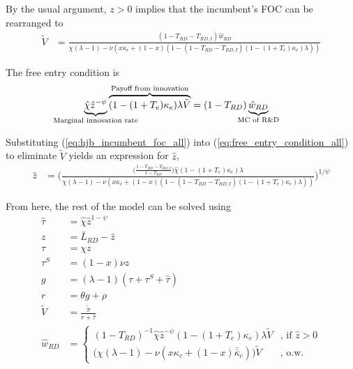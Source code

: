\documentclass[11pt,english]{article}
\begin{document}
By the usual argument, $z > 0$ implies that the incumbent's FOC can be rearranged to
\begin{align}
\tilde{V} &= \frac{(1-T_{RD} - T_{RD,I})\hat{w}_{RD}}{\chi(\lambda -1) - \nu (x\kappa_c + (1-x)(1 - (1-T_{RD} - T_{RD,I})(1-(1+T_e)\kappa_e)\lambda)) } \label{eq:hjb_incumbent_foc_all}
\end{align}

The free entry condition is
\begin{align}
\underbrace{\hat{\chi} \hat{z}^{-\psi}}_{\mathclap{\text{Marginal innovation rate}}} \overbrace{(1-(1+T_e)\kappa_e) \lambda \tilde{V}}^{\mathclap{\text{Payoff from innovation}}} &= (1-T_{RD})\underbrace{\hat{w}_{RD}}_{\mathclap{\text{MC of R\&D}}} \label{eq:free_entry_condition_all}
\end{align}

Substituting (\ref{eq:hjb_incumbent_foc_all}) into (\ref{eq:free_entry_condition_all}) to eliminate $\tilde{V}$ yields an expression for $\hat{z}$, 
\begin{align}
\hat{z} &= \Bigg( \frac{\Big(\frac{1-T_{RD} -T_{RD,I}}{1-T_{RD}} \Big)\hat{\chi} (1-(1+T_e)\kappa_{e}) \lambda}{\chi(\lambda -1) - \nu (x\kappa_c  + (1-x)(1 - (1-T_{RD} - T_{RD,I})(1-(1+T_e)\kappa_e)\lambda)) } \Bigg)^{1/\psi} \label{eq:effort_entrant_all}
\end{align}

From here, the rest of the model can be solved using
\begin{align}
\hat{\tau} &= \hat{\chi} \hat{z}^{1-\psi} \\
z &= \bar{L}_{RD} - \hat{z} \label{eq:labor_resource_constraint_all}\\ 
\tau &= \chi z \\
\tau^S &= (1-x) \nu z \\
g &= (\lambda - 1) (\tau + \tau^S + \hat{\tau}) \\
r &= \theta g + \rho \\
\tilde{V} &= \frac{\tilde{\pi}}{r + \hat{\tau}} \\ 
\hat{w}_{RD} &= \begin{cases}
(1-T_{RD})^{-1}\hat{\chi} \hat{z}^{-\psi} (1-(1+T_e)\kappa_e) \lambda \tilde{V} &\textrm{, if } \hat{z} > 0\\
\Big( \chi(\lambda -1) - \nu (x\kappa_c + (1-x)\bar{\bar{\kappa}}_c)\Big) \tilde{V} &\textrm{, o.w.}
\end{cases} \label{eq:wage_rd_labor_all}
\end{align}
\end{document}
